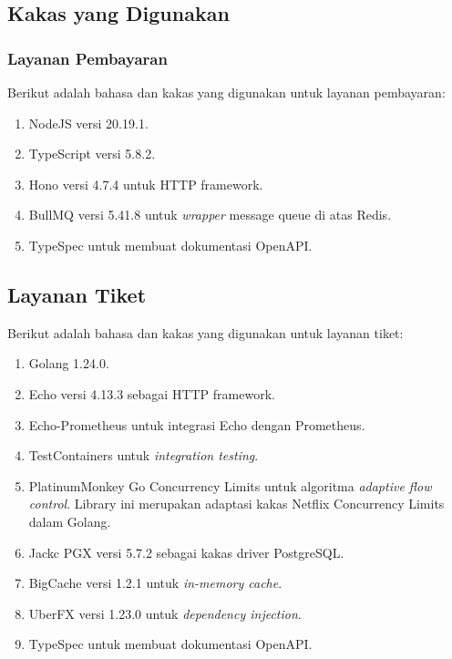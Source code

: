 \subsection{Kakas yang Digunakan}

\subsubsection{Layanan Pembayaran}

Berikut adalah bahasa dan kakas yang digunakan untuk layanan pembayaran:

\begin{enumerate}
    \item NodeJS versi 20.19.1.
    \item TypeScript versi 5.8.2.
    \item Hono versi 4.7.4 untuk HTTP framework.
    \item BullMQ versi 5.41.8 untuk \textit{wrapper} message queue di atas Redis.
    \item TypeSpec untuk membuat dokumentasi OpenAPI.
\end{enumerate}

\subsection{Layanan Tiket}

Berikut adalah bahasa dan kakas yang digunakan untuk layanan tiket:

\begin{enumerate}
    \item Golang 1.24.0.
    \item Echo versi 4.13.3 sebagai HTTP framework.
    \item Echo-Prometheus untuk integrasi Echo dengan Prometheus.
    \item TestContainers untuk \textit{integration testing}.
    \item PlatinumMonkey Go Concurrency Limits untuk algoritma \textit{adaptive flow control}. Library ini merupakan adaptasi kakas Netflix Concurrency Limits dalam Golang.
    \item Jackc PGX versi 5.7.2 sebagai kakas driver PostgreSQL.
    \item BigCache versi 1.2.1 untuk \textit{in-memory cache}.
    \item UberFX versi 1.23.0 untuk \textit{dependency injection}.
    \item TypeSpec untuk membuat dokumentasi OpenAPI.
\end{enumerate}

